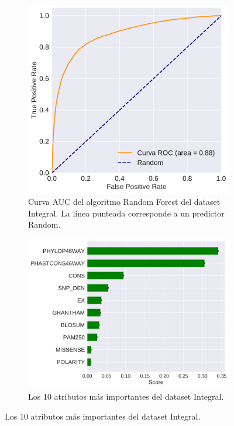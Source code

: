 \newpage

\begin{figure}[H]
\centering
\begin{subfigure}[t]{0.7\textwidth}
    \centering
    \includegraphics[width=\textwidth]{documents/latex/figures/3/integral/auc_integral.pdf}
    \caption{Curva AUC del algoritmo Random Forest del dataset Integral. La línea punteada corresponde a un predictor Random.}
    \label{fig:auc_integral}
\end{subfigure}
\hfill
\hfill
\begin{subfigure}[b]{0.7\textwidth}
    \centering
    \includegraphics[width=\textwidth]{documents/latex/figures/3/integral/importances_integral.pdf}
    \caption{Los 10 atributos más importantes del dataset Integral.}
    \label{fig:importances_integral}
\end{subfigure}

\end{figure}

